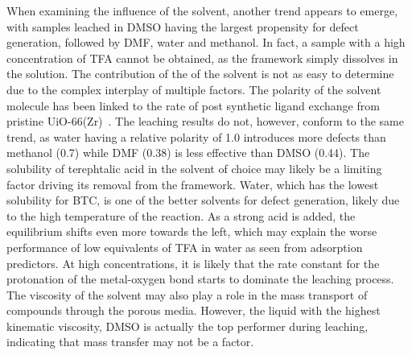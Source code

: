 When examining the influence of the solvent, another trend appears
to emerge, with samples leached in \gls{DMSO} having the largest propensity
for defect generation, followed by \gls{DMF}, water and methanol. In fact,
a sample with a high concentration of \gls{TFA} cannot be obtained, as the 
framework simply dissolves in the solution.
The contribution of the of the solvent is not as easy to determine due
to the complex interplay of multiple factors.
The polarity of the solvent molecule has been linked to 
the rate of post synthetic ligand exchange from
pristine UiO-66(Zr)~\cite{kimPostsyntheticLigandExchange2012}. The leaching
results do not, however, conform to the same trend, as water having a 
relative polarity of 1.0 introduces more defects than methanol 
(0.7) while \gls{DMF} (0.38) is less effective than 
\gls{DMSO} (0.44). The solubility of terephtalic acid in the solvent 
of choice may likely be a limiting factor driving its removal
from the framework. Water, which has the lowest solubility for 
BTC, is one of the better solvents for defect generation, likely
due to the high temperature of the reaction. As a strong acid
is added, the equilibrium shifts even more towards the 
left, which may explain the worse performance of low equivalents of \gls{TFA}
in water as seen from adsorption predictors. At high concentrations,
it is likely that the rate constant for the protonation of the 
metal-oxygen bond starts to dominate the leaching process.
The viscosity of the 
solvent may also play a role in the mass transport of compounds 
through the porous media. However, the liquid with the highest 
kinematic viscosity, \gls{DMSO} is actually the top performer during leaching,
indicating that mass transfer may not be a factor.

